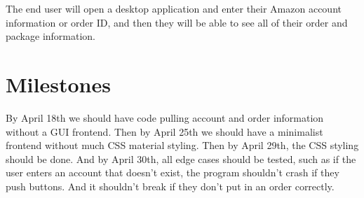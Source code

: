 \documentclass[letter]{article}
\begin{document}
The end user will open a desktop application and enter their Amazon account information or order ID, and then they will be able to see all of their order and package information.

\section*{Milestones}

By April 18th we should have code pulling account and order information without a GUI frontend. Then by April 25th we should have a minimalist frontend without much CSS material styling. Then by April 29th, the CSS styling should be done. And by April 30th, all edge cases should be tested, such as if the user enters an account that doesn't exist, the program shouldn't crash if they push buttons. And it shouldn't break if they don't put in an order correctly.
\end{document}
